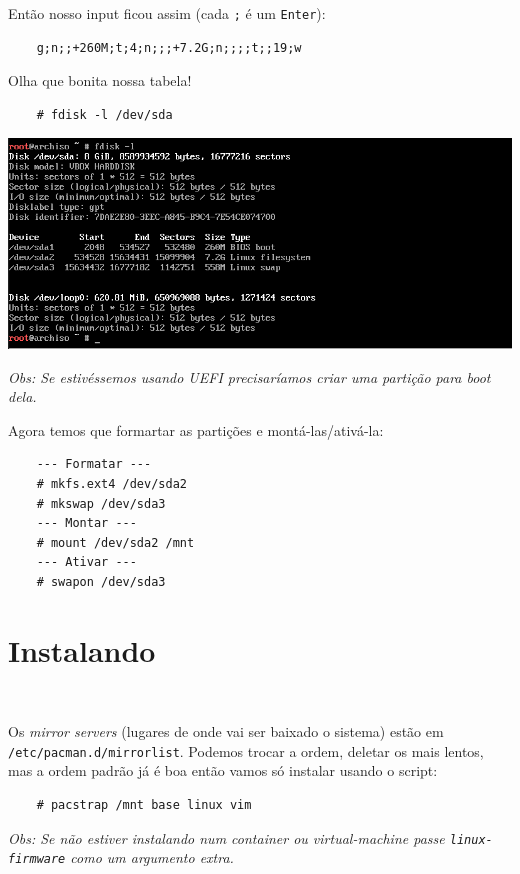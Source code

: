 \documentclass{article}
\newcommand{\obs}[1]{\textit{ Obs:#1 }}
\begin{document}
Então nosso input ficou assim (cada \texttt{;} é um \texttt{Enter}):
\begin{verbatim}
    g;n;;+260M;t;4;n;;;+7.2G;n;;;;t;;19;w
\end{verbatim}

Olha que bonita nossa tabela!

\begin{verbatim}
    # fdisk -l /dev/sda
\end{verbatim}

\begin{center}
    \includegraphics[width=\textwidth]{Imgs/Fdisk-sda.png}
\end{center}

\obs{
Se estivéssemos usando \emph{UEFI}
precisaríamos criar uma partição para boot dela.
}

Agora temos que formartar as partições
e montá-las/ativá-la:

\begin{verbatim}
    --- Formatar ---
    # mkfs.ext4 /dev/sda2
    # mkswap /dev/sda3
    --- Montar ---
    # mount /dev/sda2 /mnt
    --- Ativar ---
    # swapon /dev/sda3
\end{verbatim}

\section{Instalando}\

Os \emph{mirror servers}
(lugares de onde vai ser baixado o sistema)
estão em \texttt{/etc/pacman.d/mirrorlist}.
Podemos trocar a ordem, deletar os mais lentos,
mas a ordem padrão já é boa então vamos só instalar
usando o script:

\begin{verbatim}
    # pacstrap /mnt base linux vim
\end{verbatim}

\obs{
Se não estiver instalando num container ou virtual-machine
passe \texttt{linux-firmware} como um argumento extra.
}
\end{document}
